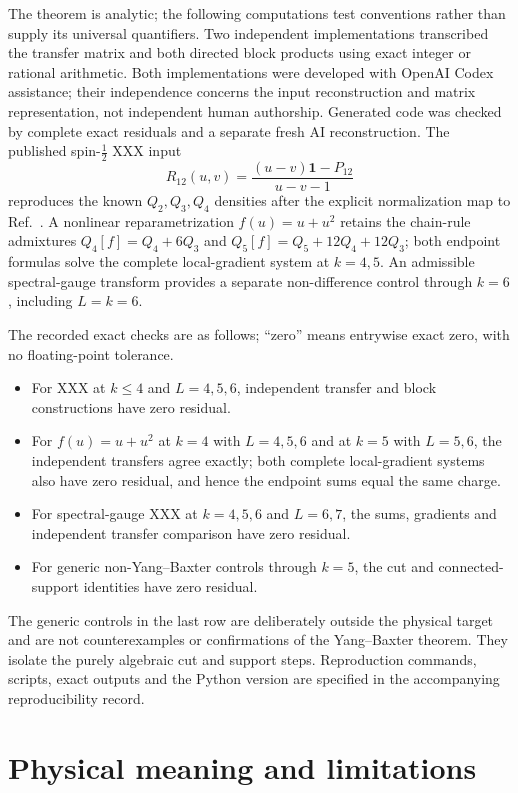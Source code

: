 \documentclass[11pt,a4paper]{article}
\theoremstyle{definition}
\theoremstyle{remark}
\begin{document}
The theorem is analytic; the following computations test conventions rather than supply
its universal quantifiers.  Two independent implementations transcribed the transfer
matrix and both directed block products using exact integer or rational arithmetic.
Both implementations were developed with OpenAI Codex assistance; their independence
concerns the input reconstruction and matrix representation, not independent human
authorship.  Generated code was checked by complete exact residuals and a separate
fresh AI reconstruction.  The
published spin-$\tfrac12$ XXX input
\begin{equation}
 R_{12}(u,v)=\frac{(u-v)\mathbf 1-P_{12}}{u-v-1}
\end{equation}
reproduces the known $Q_2,Q_3,Q_4$ densities after the explicit normalization map to
Ref.~\cite{Bargheer2009}.  A nonlinear reparametrization $f(u)=u+u^2$ retains the
chain-rule admixtures $Q_4[f]=Q_4+6Q_3$ and
$Q_5[f]=Q_5+12Q_4+12Q_3$; both endpoint formulas solve the complete local-gradient
system at $k=4,5$.  An admissible spectral-gauge transform provides a separate
non-difference control through $k=6$, including $L=k=6$.

The recorded exact checks are as follows; ``zero'' means entrywise exact zero, with no
floating-point tolerance.
\begin{itemize}
\item For XXX at $k\leq4$ and $L=4,5,6$, independent transfer and block
constructions have zero residual.
\item For $f(u)=u+u^2$ at $k=4$ with $L=4,5,6$ and at $k=5$ with $L=5,6$,
the independent transfers agree exactly; both complete local-gradient systems
also have zero residual, and hence the endpoint sums equal the same charge.
\item For spectral-gauge XXX at $k=4,5,6$ and $L=6,7$, the sums, gradients and
independent transfer comparison have zero residual.
\item For generic non-Yang--Baxter controls through $k=5$, the cut and
connected-support identities have zero residual.
\end{itemize}

The generic controls in the last row are deliberately outside the physical target and
are not counterexamples or confirmations of the Yang--Baxter theorem.  They isolate the
purely algebraic cut and support steps.  Reproduction commands, scripts, exact outputs
and the Python version are specified in the accompanying reproducibility record.

\section{Physical meaning and limitations}
\end{document}
